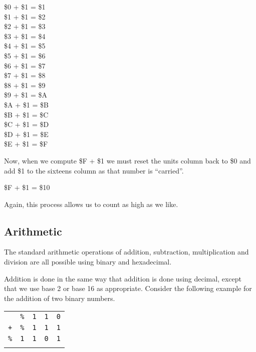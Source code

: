 \begin{center}
	\$0 + \$1 = \$1 \\
	\$1 + \$1 = \$2 \\
	\$2 + \$1 = \$3 \\
	\$3 + \$1 = \$4 \\
	\$4 + \$1 = \$5 \\
	\$5 + \$1 = \$6 \\
	\$6 + \$1 = \$7 \\
	\$7 + \$1 = \$8 \\
	\$8 + \$1 = \$9 \\
	\$9 + \$1 = \$A \\
	\$A + \$1 = \$B \\
	\$B + \$1 = \$C \\
	\$C + \$1 = \$D \\
	\$D + \$1 = \$E \\
	\$E + \$1 = \$F \\
\end{center}

Now, when we compute \$F + \$1 we must reset the units column back to \$0 and add \$1 to the sixteens column as that number is ``carried''.

\begin{center}
	\$F + \$1 = \$10
\end{center}

Again, this process allows us to count as high as we like.

\subsection{Arithmetic}
The standard arithmetic operations of addition, subtraction, multiplication and division are all possible using binary and hexadecimal.

Addition is done in the same way that addition is done using decimal, except that we use base 2 or base 16 as appropriate. Consider the following example for the addition of two binary numbers.
\begin{center}
	\begin{tabular}{ccccc}
               & \texttt{\%} & \texttt{1} & \texttt{1} & \texttt{0} \\
    \texttt{+} & \texttt{\%} & \texttt{1} & \texttt{1} & \texttt{1} \\ \hline
    \texttt{\%} & \texttt{1} & \texttt{1} & \texttt{0} & \texttt{1} \\ \hhline{=====}
	\end{tabular}
\end{center}

